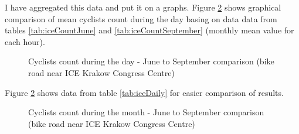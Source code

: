 I have aggregated this data and put it on a graphs. Figure \ref{fig:graph2} shows graphical comparison of mean cyclists count during the day basing on data data from tables \ref{tab:iceCountJune} and \ref{tab:iceCountSeptember} (monthly mean value for each hour).
\begin{figure}[H]
    \centering
    \caption{Cyclists count during the day - June to September comparison (bike road near ICE Krakow Congress Centre)}
    \label{fig:graph4}
\end{figure}
Figure \ref{fig:graph2} shows data from table \ref{tab:iceDaily} for easier comparison of results.
\begin{figure}[H]
    \centering
    \caption{Cyclists count during the month - June to September comparison (bike road near ICE Krakow Congress Centre)}
    \label{fig:graph2}
\end{figure}
